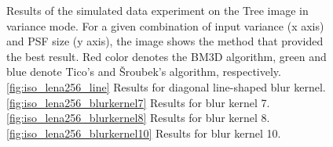 \documentclass[12pt,notitlepage]{report}
\begin{document}
\begin{figure}[htb]
  \caption[Results for the tree image in variance mode]{Results of the simulated data experiment on the Tree image in variance mode. For a given combination of input variance (x axis) and PSF size (y axis), the image shows the method that provided the best result. Red color denotes the BM3D algorithm, green and blue denote Tico's and Šroubek's algorithm, respectively. \ref{fig:iso_lena256_line} Results for diagonal line-shaped blur kernel. \ref{fig:iso_lena256_blurkernel7} Results for blur kernel 7. \ref{fig:iso_lena256_blurkernel8} Results for blur kernel 8. \ref{fig:iso_lena256_blurkernel10} Results for blur kernel 10.}
  \label{fig:var_tree256}
\end{figure}

\clearpage
\end{document}
